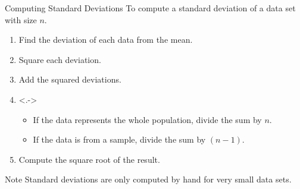 \documentclass{beamer}
\begin{document}
\begin{frame}
\begin{block}{Computing Standard Deviations}
To compute a standard deviation of a data set with size $n$.
\begin{enumerate}[<+- | alert@+>]
\item Find the deviation of each data from the mean.
\item Square each deviation.
\item Add the squared deviations.
\item<.->
\begin{itemize}
\item If the data represents the whole population, divide the sum by $n$.
\item If the data is from a sample, divide the sum by $(n-1)$.
\end{itemize}
\item Compute the square root of the result.
\end{enumerate}
\end{block}

\onslide<+->
\begin{block}{Note}
Standard deviations are only computed by hand for very small data sets.
\end{block}
\end{frame}
\end{document}
